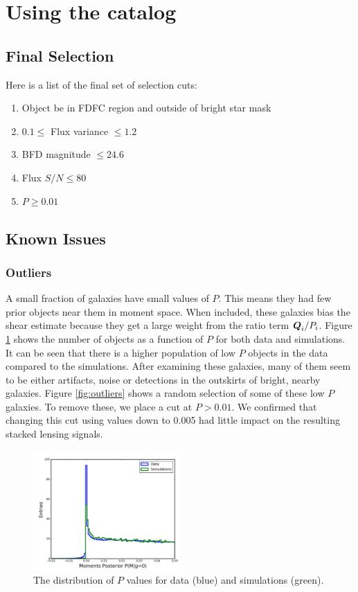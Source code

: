 \documentclass[useAMS,usenatbib]{mnras}
\newcommand{\vecQ}{\mbox{\boldmath $Q$}}
\begin{document}
\section{Using the catalog}
\label{Sec:Catalog}
\subsection{Final Selection}

Here is a list of the final set of selection cuts:
\begin{enumerate}
\item Object be in FDFC region and outside of bright star mask
\item $0.1 \leq$ Flux variance $\le 1.2$
\item BFD magnitude $\le 24.6$
\item Flux $S/N \le 80$
\item $P \ge 0.01$

\end{enumerate}



\subsection{Known Issues}
\subsubsection{Outliers}
A small fraction of galaxies have small values of $P$.  This means they had few prior objects near them in moment space.  When included, these galaxies bias the shear estimate because they get a large weight from the ratio term $\vecQ_i/P_i$.  Figure \ref{fig:p_outliers} shows the number of objects as a function of $P$ for both data and simulations.  It can be seen that there is a higher population of low $P$ objects in the data compared to the simulations.  After examining these galaxies, many of them seem to be either artifacts, noise or detections in the outskirts of bright, nearby galaxies.  Figure \ref{fig:outliers} shows a random selection of some of these low $P$ galaxies.  To remove these, we place a cut at $P>0.01$.  We confirmed that changing this cut using values down to 0.005 had little impact on the resulting stacked lensing signals.


\begin{figure}
    \includegraphics[width=0.5\textwidth]{outliers.png}
    \caption{
    The distribution of $P$ values for data (blue) and simulations (green).
    }
    \label{fig:p_outliers}
\end{figure}
\end{document}

